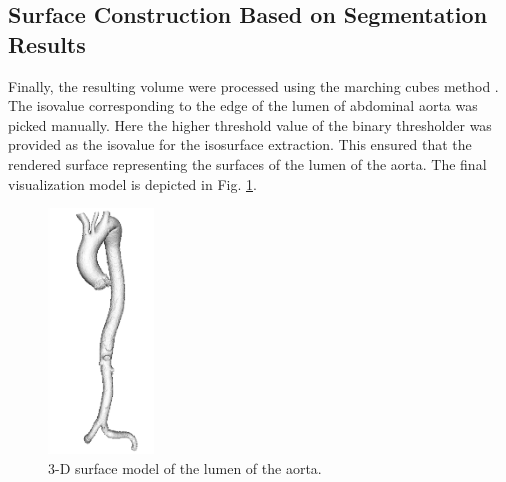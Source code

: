 \subsection{Surface Construction Based on Segmentation Results}
Finally, the resulting volume were processed using the marching cubes method \cite{Lorensen1987MC}.
The isovalue corresponding to the edge of the lumen of abdominal aorta was picked manually.
Here the higher threshold value of the binary thresholder was provided as the isovalue for the isosurface extraction.
This ensured that the rendered surface representing the surfaces of the lumen of the aorta.
The final visualization model is depicted in Fig. \ref{fig:VisualizationModel}.
\begin{figure}[t]
\centering
\includegraphics[width=1.1in]{Figures/chap03/model.png}
\caption{3-D surface model of the lumen of the aorta.}
\label{fig:VisualizationModel}
\end{figure}